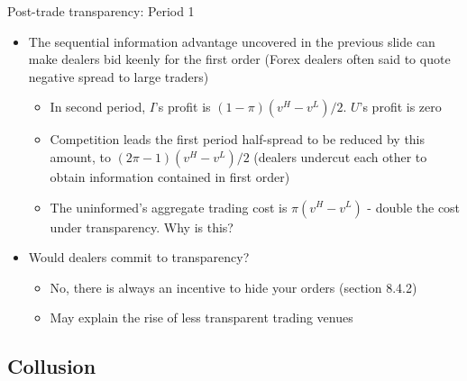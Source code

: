 \documentclass[english,10pt
,aspectratio=169
]{beamer}
\begin{document}
\begin{frame}{Post-trade transparency: Period 1}
	\begin{itemize}
		\item {} The sequential information advantage uncovered in the previous slide can make dealers bid keenly for the first order
		(Forex dealers often said to quote negative spread to large traders)
		\begin{itemize}
			\item In second period, $I$'s profit is $(1-\pi)(v^{H}-v^{L})/2$. $U$'s profit is zero
			\item Competition leads the first period half-spread to be reduced by this amount, to $(2\pi-1)(v^{H}-v^{L})/2$ (dealers undercut each other to obtain information contained in first order)
			\item The uninformed's aggregate trading cost is $\pi(v^{H}-v^{L})$ - double the cost under transparency. Why is this?
		\end{itemize}
		\item Would dealers commit to transparency?
		\begin{itemize}
			\item No, there is always an incentive to hide your orders (section 8.4.2)
			\item May explain the rise of less transparent trading venues
		\end{itemize}
	\end{itemize}
\end{frame}


\subsection{Collusion}
\end{document}
